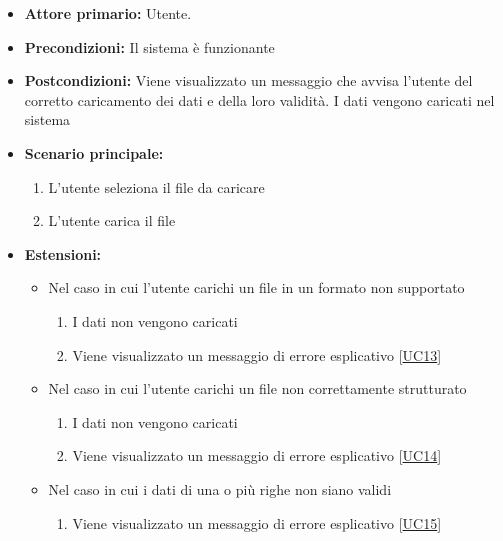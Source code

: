 \begin{itemize}
    \item \textbf{Attore primario:} Utente.
    \item \textbf{Precondizioni:} Il sistema è funzionante
    \item \textbf{Postcondizioni:} Viene visualizzato un messaggio che avvisa l'utente del corretto caricamento dei dati e della loro validità. 
                                   I dati vengono caricati nel sistema
    \item \textbf{Scenario principale:}
          \begin{enumerate}
              \item L'utente seleziona il file da caricare
              \item L'utente carica il file
          \end{enumerate}
    \item \textbf{Estensioni:}
    \begin{itemize}
        \item   Nel caso in cui l'utente carichi un file in un formato non supportato
                \begin{enumerate}
                    \item I dati non vengono caricati
                    \item Viene visualizzato un messaggio di errore esplicativo [\hyperref[sec:UC13 - Errore formato file]{UC13}] %
                \end{enumerate}
        \item   Nel caso in cui l'utente carichi un file non correttamente strutturato
                \begin{enumerate}
                    \item I dati non vengono caricati
                    \item Viene visualizzato un messaggio di errore esplicativo [\hyperref[sec:UC14 - Errore struttura dataset]{UC14}]
                \end{enumerate}
        \item   Nel caso in cui i dati di una o più righe non siano validi
                \begin{enumerate}
                    \item Viene visualizzato un messaggio di errore esplicativo [\hyperref[sec:UC15 - Errore validità riga]{UC15}] 
                \end{enumerate}
    \end{itemize} 
\end{itemize}
\newpage

